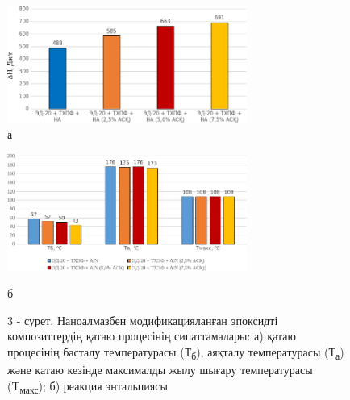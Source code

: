 \begin{figure}[H]
	\centering
	\includegraphics[width=0.7\textwidth]{media/chem/image105}
	\caption*{а}
\end{figure}
\begin{figure}[H]
	\centering
	\includegraphics[width=0.7\textwidth]{media/chem/image106}
    \caption*{б}
    \caption*{3 - сурет. Наноалмазбен модификацияланған эпоксидті
композиттердің қатаю процесінің сипаттамалары: а) қатаю процесінің
басталу температурасы (Т\textsubscript{б}), аяқталу температурасы
(Т\textsubscript{а}) және қатаю кезінде максималды жылу шығару
температурасы (T\textsubscript{макс}); б) реакция энтальпиясы}
\end{figure}

